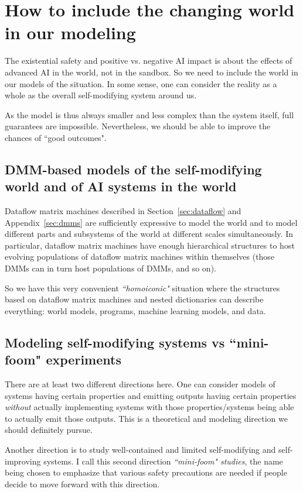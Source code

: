 \documentclass{article}
\begin{document}
\section{How to include the changing world in our modeling}\label{sec:modeling}

The existential safety and positive vs. negative AI impact is about the effects of advanced AI in the world, not in the sandbox. So we need to
include the world in our models of the situation. In some sense, one can consider the reality as a whole as the overall self-modifying system around us.

As the model is thus always smaller and less complex than the system itself, full guarantees are impossible. Nevertheless, we should be able
to improve the chances of ``good outcomes". 

\subsection{DMM-based models of the self-modifying world and of AI systems in the world}

Dataflow matrix machines described in Section~\ref{sec:dataflow} and Appendix~\ref{sec:dmms} are sufficiently expressive to model
the world and to model different parts and subsystems of the world at different scales simultaneously.
In particular, dataflow matrix machines have enough hierarchical structures to host evolving populations of dataflow
matrix machines within themselves (those DMMs can in turn host populations of DMMs, and so on).

So we have this very convenient {\em ``homoiconic"} situation where the structures based on dataflow matrix machines and nested
dictionaries can describe everything: world models, programs, machine learning models, and data.

\subsection{Modeling self-modifying systems vs ``mini-foom" experiments}

There are at least two different directions here. One can consider models of systems having certain properties and emitting
outputs having certain properties {\em without} actually implementing systems with those properties/systems
being able to actually emit those outputs. This is a theoretical and modeling direction we should definitely pursue.

Another direction is to study well-contained and limited self-modifying and self-improving systems. 
I call this second direction {\em ``mini-foom" studies}, the name being chosen to emphasize 
that various safety precautions are needed if people decide to move forward with this direction.
\end{document}
